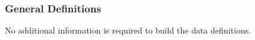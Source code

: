 \subsubsection{General Definitions}\label{sec_gendef}

No additional information is required to build the data definitions.